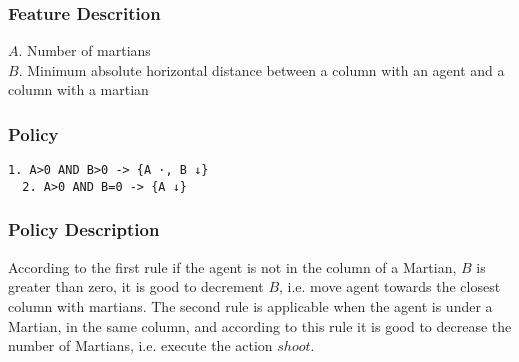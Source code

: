 \documentclass[a4paper]{article}
\begin{document}
\subsubsection{Feature Descrition}
$A$. Number of martians\\
$B$. Minimum absolute horizontal distance between a column with an agent and a column with a martian

\subsubsection{Policy}
\begin{Verbatim}[fontsize=\footnotesize]
  1. A>0 AND B>0 -> {A ·, B ↓}
  2. A>0 AND B=0 -> {A ↓}
\end{Verbatim}

\subsubsection{Policy Description}
According to the first rule if the agent is not in the column of a Martian, $B$ is greater than zero, it is good to decrement $B$, i.e. move agent towards the closest column with martians. The second rule is applicable when the agent is under a Martian, in the same column, and according to this rule it is good to decrease the number of Martians, i.e. execute the action $shoot$.
\end{document}
